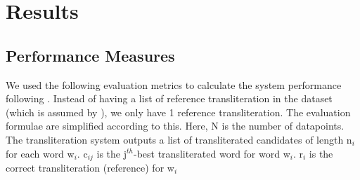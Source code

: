 \documentclass[11pt,a4paper]{article}
\begin{document}
\section{Results}

\subsection{Performance Measures}
We used the following evaluation metrics to calculate the system performance following \citet{report-news2016-1}. Instead of having a list of reference transliteration in the dataset (which is assumed by \citet{report-news2016-1}), we only have 1 reference transliteration. The evaluation formulae are simplified according to this. Here, N is the number of datapoints. The transliteration system outputs a list of transliterated candidates of length n$_i$ for each word w$_i$. c$_{ij}$ is the j$^{th}$-best transliterated word for word w$_{i}$. r$_i$ is the correct transliteration (reference) for w$_i$
\end{document}
